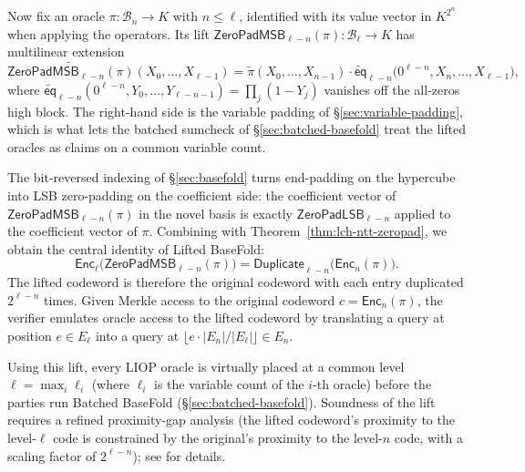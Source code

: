 \documentclass{article}
\theoremstyle{definition}
\newcommand*{\mle}{\widetilde}
\newcommand{\eq}{\mathsf{eq}}
\newcommand{\BB}{\mathcal{B}}
\begin{document}
Now fix an oracle $\pi \colon \BB_n \to K$ with $n \leq \boldsymbol{\ell}$, identified with its value vector in $K^{2^n}$ when applying the operators. Its lift $\textsf{ZeroPadMSB}_{\boldsymbol{\ell} - n}(\pi) \colon \BB_{\boldsymbol{\ell}} \to K$ has multilinear extension
\begin{equation}
  \mle{\textsf{ZeroPadMSB}_{\boldsymbol{\ell} - n}(\pi)}(X_0, \ldots, X_{\boldsymbol{\ell} - 1}) = \mle{\pi}(X_0, \ldots, X_{n - 1}) \cdot \mle{\eq}_{\boldsymbol{\ell} - n}\bigl( 0^{\boldsymbol{\ell} - n}, X_n, \ldots, X_{\boldsymbol{\ell} - 1} \bigr),
  \label{eq:zeropad-msb-mle}
\end{equation}
where $\mle{\eq}_{\boldsymbol{\ell} - n}(0^{\boldsymbol{\ell} - n}, Y_0, \ldots, Y_{\boldsymbol{\ell} - n - 1}) = \prod_j (1 - Y_j)$ vanishes off the all-zeros high block. The right-hand side is the variable padding of \S\ref{sec:variable-padding}, which is what lets the batched sumcheck of \S\ref{sec:batched-basefold} treat the lifted oracles as claims on a common variable count.

The bit-reversed indexing of \S\ref{sec:basefold} turns end-padding on the hypercube into LSB zero-padding on the coefficient side: the coefficient vector of $\textsf{ZeroPadMSB}_{\boldsymbol{\ell} - n}(\pi)$ in the novel basis is exactly $\textsf{ZeroPadLSB}_{\boldsymbol{\ell} - n}$ applied to the coefficient vector of $\pi$. Combining with Theorem~\ref{thm:lch-ntt-zeropad}, we obtain the central identity of Lifted BaseFold:
\begin{equation}
  \textsf{Enc}_{\boldsymbol{\ell}}\bigl( \textsf{ZeroPadMSB}_{\boldsymbol{\ell} - n}(\pi) \bigr) = \textsf{Duplicate}_{\boldsymbol{\ell} - n}\bigl( \textsf{Enc}_n(\pi) \bigr).
  \label{eq:lifted-basefold-identity}
\end{equation}
The lifted codeword is therefore the original codeword with each entry duplicated $2^{\boldsymbol{\ell} - n}$ times. Given Merkle access to the original codeword $c = \textsf{Enc}_n(\pi)$, the verifier emulates oracle access to the lifted codeword by translating a query at position $e \in E_{\boldsymbol{\ell}}$ into a query at $\lfloor e \cdot |E_n| / |E_{\boldsymbol{\ell}}| \rfloor \in E_n$.

Using this lift, every LIOP oracle is virtually placed at a common level $\boldsymbol{\ell} = \max_i \ell_i$ (where $\ell_i$ is the variable count of the $i$-th oracle) before the parties run Batched BaseFold (\S\ref{sec:batched-basefold}). Soundness of the lift requires a refined proximity-gap analysis (the lifted codeword's proximity to the level-$\boldsymbol{\ell}$ code is constrained by the original's proximity to the level-$n$ code, with a scaling factor of $2^{\boldsymbol{\ell} - n}$); see \cite{youtube:LiftedFRI} for details.
\end{document}

